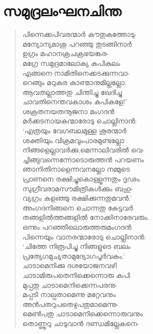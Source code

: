 
\section{സമുദ്രലംഘനചിന്ത}

\begin{verse}
പിന്നെക്കപിവരന്മാര്‍ കൗതുകത്തോടു-\\
മന്യോന്യമാശു പറഞ്ഞു തുടങ്ങിനാര്‍\\
ഉഗ്രം മഹാനക്രചക്രഭയങ്കര-\\
മഗ്രേ സമുദ്രമാലോക്യ കപികുലം\\
എങ്ങനെ നാമിതിനെക്കടക്കുന്നവാ-\\
റെങ്ങും മറുകര കാണ്മാനുമില്ലല്ലോ.\\
ആവതല്ലാത്തതു ചിന്തിച്ചു ഖേദിച്ചു\\
ചാവതിനെന്തവകാശം കപികളേ!’\\
ശക്രതനയതനൂജനാ മംഗദന്‍\\
മര്‍ക്കടനായകന്മാരോടു ചൊല്ലിനാന്‍:\\
‘എത്രയും വേഗബലമുള്ള ശൂരന്മാര്‍\\
ശക്തിയും വിക്രമവുംപാരമുണ്ടല്ലോ\\
നിങ്ങളെല്ലാവര്‍ക്കു,മെന്നാലിവരില്‍ വെ-\\
ച്ചിങ്ങുവന്നെന്നോടൊരുത്തന്‍ പറയണം\\
ഞാനിതിനാളെന്നവനല്ലോ നമ്മുടെ\\
പ്രാണനെ രക്ഷിച്ചുകൊള്ളൂന്നതും ദൃഢം.\\
സുഗ്രീവരാമസൗമിത്രികള്‍ക്കും ബഹു-\\
വ്യഗ്രം കളഞ്ഞു രക്ഷിക്കുന്നതുമവന്‍.’\\
അംഗദനിങ്ങനെ ചൊന്നതു കേട്ടവര്‍\\
തങ്ങളില്‍ത്തങ്ങളില്‍ നോക്കിനാരേവരും.\\
ഒന്നും പറഞ്ഞീലൊരുത്തരുമംഗദന്‍\\
പിന്നെയും വാനരന്മാരോടു ചൊല്ലിനാന്‍:\\
‘ചിത്തേ നിരൂപിച്ചു നിങ്ങളുടെ ബലം\\
പ്രത്യേഗമുച്യതാമുദ്യോഗപൂര്‍വകം.’\\
ചാടാമെനിക്കു ദശയോജനവഴി\\
ചാടാമിരുപതെനിക്കെന്നൊരു കപി\\
മുപ്പതു ചാടാമെനിക്കെന്നപരനു-\\
മപ്പടി നാല്പതാമെന്നു മറ്റേവനും\\
അന്‍പതറുപതെഴുപതുമാമെന്നു-\\
മെണ്‍പതു ചാടാമെനിക്കെന്നൊരുവനും\\
തൊണ്ണൂറു ചാടുവാന്‍ ദണ്ഡമില്ലേകനെ-\\

\end{verse}

